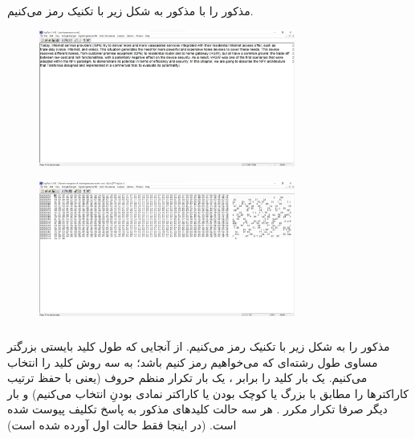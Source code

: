 \documentclass{article}
\begin{document}
\subsection{}%

\subsubsection{}
 مذکور را با  مذکور به شکل زیر با تکنیک  رمز می‌کنیم.
\begin{figure}[H]
    \centering
    \includegraphics[width=0.75\textwidth]{figures/5a0.jpg}
    \caption
	{}
    \label{fig:fig1}
\end{figure}
\begin{figure}[H]
    \centering
    \includegraphics[width=0.75\textwidth]{figures/5a1.jpg}
    \caption
	{}
    \label{fig:fig1}
\end{figure}

\subsubsection{}
 مذکور را به شکل زیر با تکنیک  رمز می‌کنیم. از آنجایی که طول کلید  بایستی بزرگتر مساوی طول رشته‌ای که می‌خواهیم رمز کنیم باشد؛ به سه روش کلید  را انتخاب می‌کنیم. یک بار کلید را برابر ، یک بار تکرار منظم حروف  (یعنی با حفظ ترتیب کاراکترها را مطابق با بزرگ یا کوچک بودن یا کاراکتر نمادی بودنِ  انتخاب می‌کنیم) و بار دیگر صرفا تکرار مکرر . هر سه حالت کلیدهای مذکور به پاسخ تکلیف پیوست شده است. (در اینجا فقط حالت اول آورده شده است)
\end{document}
